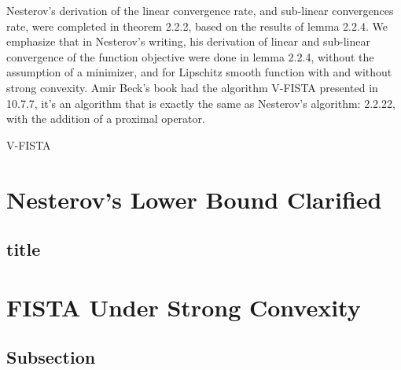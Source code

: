 \documentclass[]{article}
\theoremstyle{definition}
\numberwithin{equation}{subsection}
\begin{document}
        
        Nesterov's derivation of the linear convergence rate, and sub-linear convergences rate, were completed in theorem 2.2.2, based on the results of lemma 2.2.4. 
        We emphasize that in Nesterov's writing, his derivation of linear and sub-linear convergence of the function objective were done in lemma 2.2.4, without the assumption of a minimizer, and for Lipschitz smooth function with and without strong convexity. 
        Amir Beck's book had the algorithm V-FISTA presented in 10.7.7, it's an algorithm that is exactly the same as Nesterov's algorithm: 2.2.22, with the addition of a proximal operator. 
        \begin{algorithm}\label{alg:V-FISTA}
        \begin{algorithmic}[1]
        \end{algorithmic}\caption{V-FISTA}
        \end{algorithm}

        



\section{Nesterov's Lower Bound Clarified}\label{sec:optimal_lower_bound}
    \subsection{title}

\section{FISTA Under Strong Convexity}\label{sec:fista_strong_convexity}
    
    \subsection{Subsection}
\end{document}
